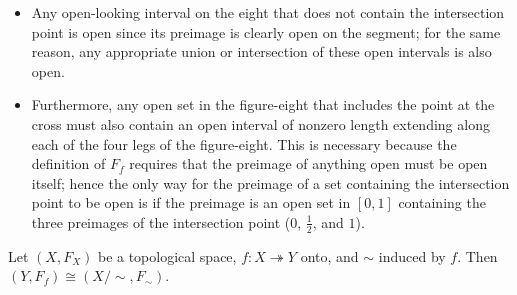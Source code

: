 \begin{itemize}
	\item Any open-looking interval on the eight that does not contain the intersection point is open since its preimage is clearly open on the segment; for the same reason, any appropriate union or intersection of these open intervals is also open. 
	\item Furthermore, any open set in the figure-eight that includes the point at the cross must also contain an open interval of nonzero length extending along each of the four legs of the figure-eight. This is necessary because the definition of $F_f$ requires that the preimage of anything open must be open itself; hence the only way for the preimage of a set containing the intersection point to be open is if the preimage is an open set in $[0,1]$ containing the three preimages of the intersection point ($0$, $\frac{1}{2}$, and $1$). 
\end{itemize}

\placeholder
\begin{theorem}
	Let $(X,F_X)$ be a topological space, $f: X \twoheadrightarrow Y$ onto, and $\sim$ induced by $f$. Then $(Y,F_f) \cong (X/\sim,F_\sim)$. 
\end{theorem}

